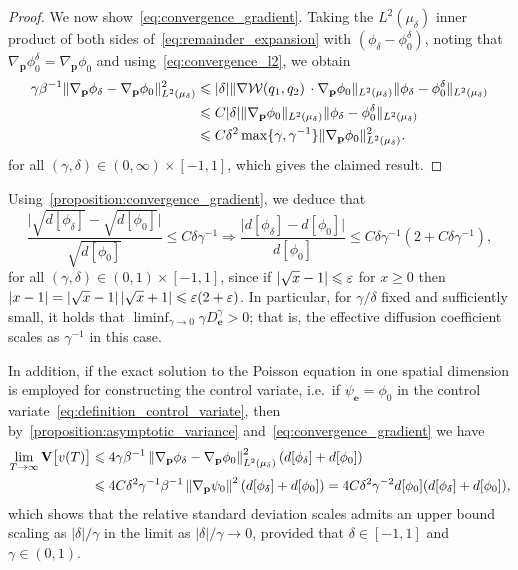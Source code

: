 \documentclass[11pt,a4paper]{article}
\newcommand{\var}[0]{\mathbf{V}}
\newcommand{\grad}{\nabla}
\newcommand{\vect}[1]{\boldsymbol{\mathbf #1}}
\theoremstyle{plain}
\numberwithin{equation}{section}
\renewcommand{\leq}{\leqslant}
\renewcommand{\geq}{\geqslant}
\begin{document}
\begin{proof}
    We now show~\eqref{eq:convergence_gradient}.
    Taking the $L^2(\mu_{\delta})$ inner product of both sides of~\eqref{eq:remainder_expansion} with $(\phi_\delta - \phi_0^{\delta})$,
    noting that $\grad_{\vect p} \phi_0^{\delta} = \grad_{\vect p} \phi_0$
    and using~\eqref{eq:convergence_l2},
    we obtain
    \begin{align*}
        \notag
        \gamma \beta^{-1} \norm*{\grad_{\vect p} \phi_\delta - \grad_{\vect p} \phi_0}[L^2(\mu_{\delta})]^2
        &\leq \lvert \delta \rvert \norm*{\grad \mathcal W(q_1, q_2) \, \cdot \grad_{\vect p} \phi_0}[L^2(\mu_{\delta})] \norm*{\phi_\delta - \phi_0^{\delta}}[L^2(\mu_{\delta})] \\
        \label{eq:intermediate_delta}
        &\leq C \lvert \delta \rvert \norm*{\grad_{\vect p} \phi_0}[L^2(\mu_{\delta})] \norm*{\phi_\delta - \phi_0^{\delta}}[L^2(\mu_{\delta})] \\
        &\leq  C \delta^2 \max\{\gamma, \gamma^{-1}\} \norm*{\grad_{\vect p} \phi_0}[L^2(\mu_{\delta})]^2.
    \end{align*}
    for all $(\gamma, \delta) \in (0, \infty) \times [-1, 1]$,
    which gives the claimed result.
\end{proof}

Using~\cref{proposition:convergence_gradient},
we deduce that
\[
    \frac{ \lvert \sqrt{d[\phi_{\delta}]} - \sqrt{d[\phi_{0}]} \rvert } {\sqrt{d[\phi_{0}]}}
    \leq C \delta \gamma^{-1}
    \Rightarrow
    \frac{ \lvert d[\phi_{\delta}] - d[\phi_{0}] \rvert } {d[\phi_{0}]}
    \leq  C \delta \gamma^{-1} (2 + C \delta \gamma^{-1}),
\]
for all $(\gamma, \delta) \in (0, 1) \times [-1, 1]$,
since if $\abs{\sqrt{x} - 1} \leq \varepsilon$ for $x \geq 0$ then $\abs{x-1} = \abs{\sqrt{x} - 1} \abs{\sqrt{x} + 1} \leq \varepsilon (2 + \varepsilon)$.
In particular, for $\gamma/\delta$ fixed and sufficiently small,
it holds that $\liminf_{\gamma \to 0} \gamma D^{\gamma}_{\vect e} > 0$;
that is, the effective diffusion coefficient scales as $\gamma^{-1}$ in this case.

In addition, if the exact solution to the Poisson equation in one spatial dimension is employed for constructing the control variate,
i.e.\ if $\psi_{\vect e} = \phi_0$ in the control variate~\eqref{eq:definition_control_variate},
then by~\cref{proposition:asymptotic_variance} and~\eqref{eq:convergence_gradient}
we have
\begin{align*}
    \lim_{T \to \infty} \var \bigl[v(T)\bigr]
    &\leq 4 \gamma \beta^{-1} \norm{\grad_{\vect p} \phi_{\delta} - \grad_{\vect p} \phi_0}[L^2(\mu_{\delta})]^2 (d[\phi_{\delta}] + d[\phi_0]) \\
    &\leq 4 C \delta^2 \gamma^{-1} \beta^{-1} \norm{\grad_{\vect p} \psi_{0}}^2 (d[\phi_{\delta}] + d[\phi_0])
    = 4 C \delta^2 \gamma^{-2} d[\phi_{0}] (d[\phi_{\delta}] + d[\phi_0]),
\end{align*}
which shows that the relative standard deviation scales admits an upper bound scaling as $\lvert \delta \rvert / \gamma$
in the limit as $\lvert \delta \rvert/\gamma \to 0$,
provided that $\delta \in [-1, 1]$ and $\gamma \in (0, 1)$.
\end{document}
